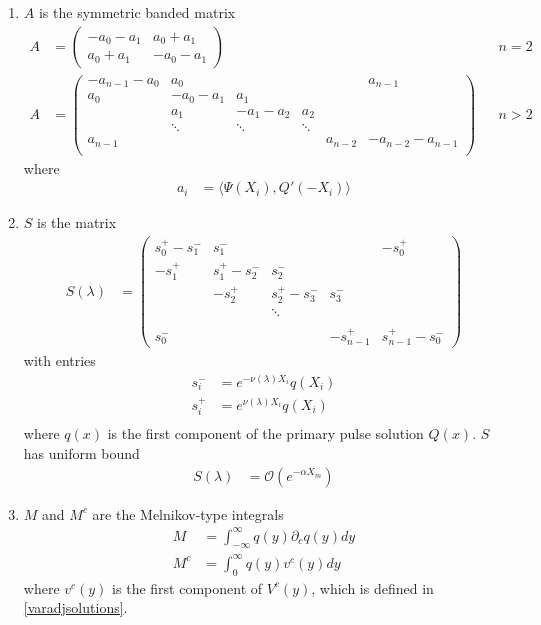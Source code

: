 \documentclass[thesis.tex]{subfiles}
\begin{document}
\begin{theorem}
\begin{enumerate}
\item $A$ is the symmetric banded matrix
\begin{align}\label{Asymm}
A &= \begin{pmatrix}
-a_0 -a_1 & a_0 + a_1 \\
a_0 + a_1 & -a_0 - a_1
\end{pmatrix} && n = 2 \\
A &= \begin{pmatrix}
-a_{n-1} - a_0 & a_0 & & &  & a_{n-1}\\
a_0 & -a_0 - a_1 &  a_1 \\
& a_1 & -a_1 - a_2 &  a_2 \\
& \ddots & \ddots & \ddots \\
a_{n-1} & & & & a_{n-2} & -a_{n-2} - a_{n-1} \\
\end{pmatrix} && n > 2 \nonumber
\end{align}
where
\begin{align*}
a_i &= \langle \Psi(X_i), Q'(-X_i) \rangle
\end{align*}

\item $S$ is the matrix
\begin{align*}
S(\lambda) &= \begin{pmatrix}
s_0^+ - s_1^- & s_1^- &&& -s_0^+ \\
-s_1^+ & s_1^+ - s_2^- & s_2^- \\
& -s_2^+ & s_2^+ - s_3^- & s_3^- \\ && \ddots \\
\\
s_0^- &&& -s_{n-1}^+ & s_{n-1}^+ - s_0^- 
\end{pmatrix}
\end{align*}
with entries
\begin{align*}
s_i^- &= e^{-\nu(\lambda)X_i} q(X_i)\\
s_i^+ &= e^{\nu(\lambda)X_i} q(X_i)\\
\end{align*}
where $q(x)$ is the first component of the primary pulse solution $Q(x)$. $S$ has uniform bound
\begin{align*}
S(\lambda) &= \mathcal{O}( e^{-\alpha X_m})
\end{align*}

\item $M$ and $M^c$ are the Melnikov-type integrals
\begin{align*}
M &= \int_{-\infty}^\infty q(y) \partial_c q(y) dy \\
M^c &= \int_{0}^\infty q(y) v^c(y) dy
\end{align*}
where $v^c(y)$ is the first component of $V^c(y)$, which is defined in \cref{varadjsolutions}.


\end{enumerate}
\end{theorem}
\end{document}

